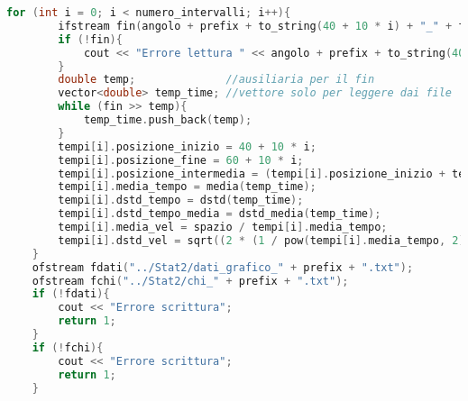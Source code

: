 \documentclass[a4paper,11pt,oneside]{article}
\begin{document}
\begin{lstlisting}[language=C++, label=lst:seconda_analisi.cxx, caption=seconda\_analisi.cxx]
    for (int i = 0; i < numero_intervalli; i++){
        ifstream fin(angolo + prefix + to_string(40 + 10 * i) + "_" + to_string(60 + 10 * i) + extension);
        if (!fin){
            cout << "Errore lettura " << angolo + prefix + to_string(40 + 10 * i) + "_" + to_string(60 + 10 * i) + extension << endl;
        }
        double temp;              //ausiliaria per il fin
        vector<double> temp_time; //vettore solo per leggere dai file
        while (fin >> temp){
            temp_time.push_back(temp);
        }
        tempi[i].posizione_inizio = 40 + 10 * i;
        tempi[i].posizione_fine = 60 + 10 * i;
        tempi[i].posizione_intermedia = (tempi[i].posizione_inizio + tempi[i].posizione_fine) / 2;
        tempi[i].media_tempo = media(temp_time);
        tempi[i].dstd_tempo = dstd(temp_time);
        tempi[i].dstd_tempo_media = dstd_media(temp_time);
        tempi[i].media_vel = spazio / tempi[i].media_tempo;
        tempi[i].dstd_vel = sqrt((2 * (1 / pow(tempi[i].media_tempo, 2)) * pow(dstd_spazio, 2)) + (pow(0.2, 2) * (1 / pow(tempi[i].media_tempo, 4)) * (pow(tempi[i].dstd_tempo_media, 2))));
    }
    ofstream fdati("../Stat2/dati_grafico_" + prefix + ".txt");
    ofstream fchi("../Stat2/chi_" + prefix + ".txt");
    if (!fdati){
        cout << "Errore scrittura";
        return 1;
    }
    if (!fchi){
        cout << "Errore scrittura";
        return 1;
    }


\end{lstlisting}
\end{document}
